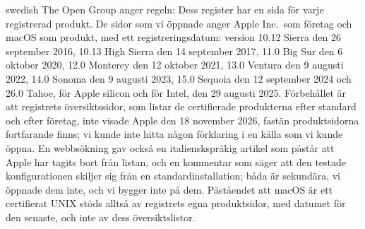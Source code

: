 \begin{onlyin}{swedish}
The Open Group anger regeln:
Dess register har en sida för varje registrerad produkt.
De sidor som vi öppnade anger Apple Inc.\ som företag och macOS som
produkt, med ett registreringsdatum: version 10.12 Sierra den 26
september 2016, 10.13 High Sierra den 14 september 2017, 11.0 Big Sur
den 6 oktober 2020, 12.0 Monterey den 12 oktober 2021, 13.0 Ventura den
9 augusti 2022, 14.0 Sonoma den 9 augusti 2023, 15.0 Sequoia den 12
september 2024 och 26.0 Tahoe, för Apple silicon och för Intel, den 29
augusti 2025\autocite{OpenGroup2026Register}.
Förbehållet är att registrets översiktssidor, som listar de
certifierade produkterna efter standard och efter företag, inte visade
Apple den 18 november 2026, fastän produktsidorna fortfarande finns; vi
kunde inte hitta någon förklaring i en källa som vi kunde öppna.
En webbsökning gav också en italienskspråkig artikel som påstår att
Apple har tagits bort från listan, och en kommentar som säger att den
testade konfigurationen skiljer sig från en standardinstallation; båda
är sekundära, vi öppnade dem inte, och vi bygger inte på dem.
Påståendet att macOS är ett certifierat UNIX stöds alltså av registrets
egna produktsidor, med datumet för den senaste, och inte av dess
översiktslistor.
\end{onlyin}

